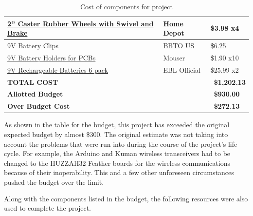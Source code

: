 \begin{table} [H]
\begin{tabular}{|l|l|l|}
		\hline
		\href{https://www.homedepot.com/}{2'' Caster Rubber Wheels with Swivel and Brake} 	& Home Depot 		& \$3.98 x4 \\
		\hline
		\href{https://www.amazon.com/gp/product/B0779ZSNS3/ref=ppx_yo_dt_b_asin_title_o01_s00?ie=UTF8\&psc=1}{9V Battery Clips} 	& BBTO US 		& \$6.25 \\
		\hline
		\href{https://www.mouser.com/ProductDetail/Keystone-Electronics/1294?qs=sGAEpiMZZMsb53hqUvtGaal96fsGiPnZeBRTs87TntQ\%3D}{9V Battery Holders for PCBs} 	& Mouser 		& \$1.90 x10 \\
		\hline
		\href{https://www.amazon.com/gp/product/B00GLK1BO2/ref=ppx_yo_dt_b_asin_title_o01_s01?ie=UTF8\&th=1}{9V Rechargeable Batteries 6 pack} 	& EBL Official 		& \$25.99 x2 \\
		\hline

		\hline
				\textbf{TOTAL COST} & & \ \textbf{\$1,202.13} \\
				\hline
				\textbf{Allotted Budget} & & \ \textbf{\$930.00} \\
				\hline
				\hline
				\textbf{Over Budget Cost} & & \ \textbf{\$272.13} \\
		\hline 
	\end{tabular} 
	\caption{Cost of components for project}
	\label{table:1}
\end{table}	

As shown in the table for the budget, this project has exceeded the original expected budget by almost \$300. The original estimate was not taking into account the problems that were run into during the course of the project's life cycle. For example, the Arduino and Kuman wireless transceivers had to be changed to the HUZZAH32 Feather boards for the wireless communications because of their inoperability. This and a few other unforeseen circumstances pushed the budget over the limit.\par

\setlength{\parindent}{2.5ex}Along with the components listed in the budget, the following resources were also used to complete the project.

